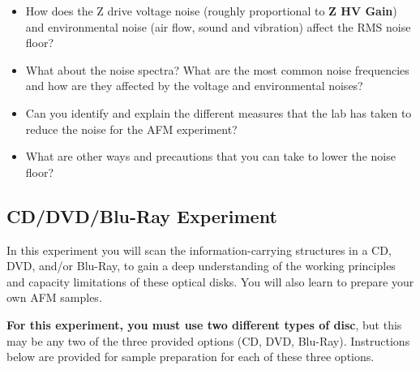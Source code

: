 \documentclass{../lab}
\begin{document}
\begin{enumerate}
    \begin{itemize}
        \item How does the Z drive voltage noise (roughly proportional to \textbf{Z HV Gain}) and environmental noise (air flow, sound and vibration) affect the RMS noise floor?
        \item What about the noise spectra? What are the most common noise frequencies and how are they affected by the voltage and environmental noises?
        \item Can you identify and explain the different measures that the lab has taken to reduce the noise for the AFM experiment?
        \item What are other ways and precautions that you can take to lower the noise floor?
    \end{itemize}

\end{enumerate}


\subsection{CD/DVD/Blu-Ray Experiment}
\label{subsec:CD/DVD}

In this experiment you will scan the information-carrying structures in a CD, DVD, and/or Blu-Ray, to gain a deep understanding of the working principles and capacity limitations of these optical disks. You will also learn to prepare your own AFM samples.

\textbf{For this experiment, you must use two different types of disc}, but this may be any two of the three provided options (CD, DVD, Blu-Ray). Instructions below are provided for sample preparation for each of these three options.

\end{document}
